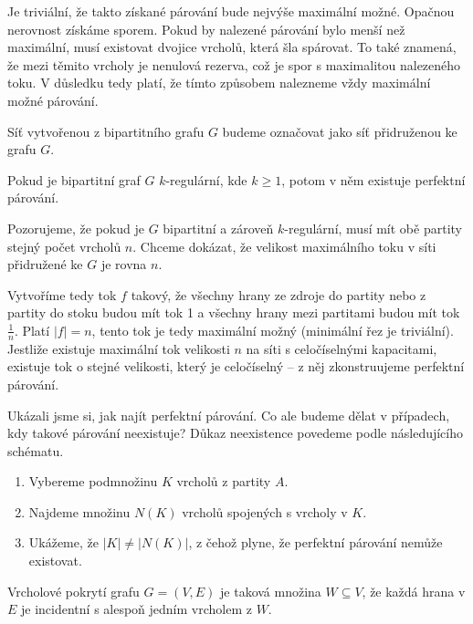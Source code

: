 Je triviální, že takto získané párování bude nejvýše maximální možné. Opačnou nerovnost získáme sporem. Pokud by nalezené párování bylo menší než maximální, musí existovat dvojice vrcholů, která šla spárovat. To také znamená, že mezi těmito vrcholy je nenulová rezerva, což je spor s maximalitou nalezeného toku. V důsledku tedy platí, že tímto způsobem nalezneme vždy maximální možné párování.

\begin{t_definition}
  Síť vytvořenou z bipartitního grafu $G$ budeme označovat jako síť přidruženou ke grafu $G$.
\end{t_definition}

\begin{t_claim}
  Pokud je bipartitní graf $G$ $k$-regulární, kde $k\geq 1$, potom v něm existuje perfektní párování.
\end{t_claim}

\begin{t_proof}
  Pozorujeme, že pokud je $G$ bipartitní a zároveň $k$-regulární, musí mít obě partity stejný počet vrcholů $n$. Chceme dokázat, že velikost maximálního toku v síti přidružené ke $G$ je rovna $n$.
  
  Vytvoříme tedy tok $f$ takový, že všechny hrany ze zdroje do partity nebo z partity do stoku budou mít tok 1 a všechny hrany mezi partitami budou mít tok $\frac{1}{n}$. Platí $|f|=n$, tento tok je tedy maximální možný (minimální řez je triviální). Jestliže existuje maximální tok velikosti $n$ na síti s celočíselnými kapacitami, existuje tok o stejné velikosti, který je celočíselný – z něj zkonstruujeme perfektní párování.
\end{t_proof}

Ukázali jsme si, jak najít perfektní párování. Co ale budeme dělat v případech, kdy takové párování neexistuje? Důkaz neexistence povedeme podle následujícího schématu.
\begin{enumerate}
  \item Vybereme podmnožinu $K$ vrcholů z partity $A$.
  \item Najdeme množinu $N(K)$ vrcholů spojených s vrcholy v $K$.
  \item Ukážeme, že $|K|\neq |N(K)|$, z čehož plyne, že perfektní párování nemůže existovat.
\end{enumerate}

\begin{t_definition}
  Vrcholové pokrytí grafu $G=(V,E)$ je taková množina $W\subseteq V$, že každá hrana v $E$ je incidentní s alespoň jedním vrcholem z $W$.
\end{t_definition}


